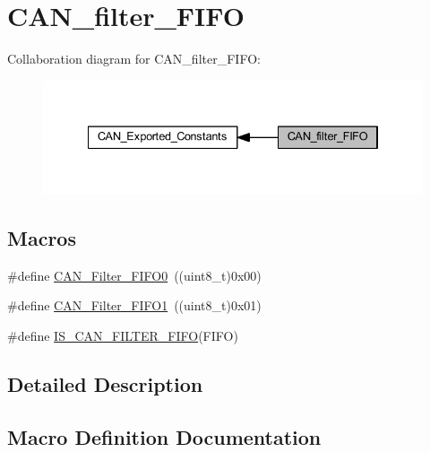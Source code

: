 \hypertarget{group___c_a_n__filter___f_i_f_o}{}\section{C\+A\+N\+\_\+filter\+\_\+\+F\+I\+FO}
\label{group___c_a_n__filter___f_i_f_o}
Collaboration diagram for C\+A\+N\+\_\+filter\+\_\+\+F\+I\+FO\+:
\nopagebreak
\begin{figure}[H]
\begin{center}
\leavevmode
\includegraphics[width=334pt]{group___c_a_n__filter___f_i_f_o}
\end{center}
\end{figure}
\subsection*{Macros}
\begin{DoxyCompactItemize}
\item 
\#define \hyperlink{group___c_a_n__filter___f_i_f_o_ga8249c27978ca94676530540b88a6be8f}{C\+A\+N\+\_\+\+Filter\+\_\+\+F\+I\+F\+O0}~((uint8\+\_\+t)0x00)
\item 
\#define \hyperlink{group___c_a_n__filter___f_i_f_o_gaab8478c89a607c4b8baf68efc730e316}{C\+A\+N\+\_\+\+Filter\+\_\+\+F\+I\+F\+O1}~((uint8\+\_\+t)0x01)
\item 
\#define \hyperlink{group___c_a_n__filter___f_i_f_o_ga2df5ae0de841fc80c969e9147991ec9d}{I\+S\+\_\+\+C\+A\+N\+\_\+\+F\+I\+L\+T\+E\+R\+\_\+\+F\+I\+FO}(F\+I\+FO)
\end{DoxyCompactItemize}


\subsection{Detailed Description}


\subsection{Macro Definition Documentation}
\mbox{\label{group___c_a_n__filter___f_i_f_o_ga8249c27978ca94676530540b88a6be8f}} 
